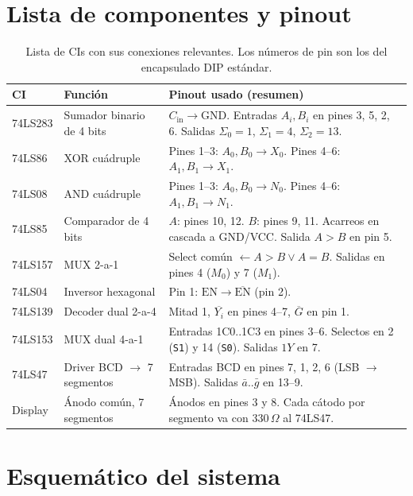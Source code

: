 \documentclass[a4paper,12pt]{article}
\begin{document}
\section{Lista de componentes y pinout}
\begin{table}[H]
\centering
\footnotesize
\setlength{\tabcolsep}{4pt}
\begin{tabular}{p{2.0cm}p{4.0cm}p{8.0cm}}
\toprule
\textbf{CI} & \textbf{Funci\'{o}n} & \textbf{Pinout usado (resumen)} \\
\midrule
74LS283 & Sumador binario de 4 bits
  & $C_\text{in}\!\to\!\mathrm{GND}$. Entradas $A_i,B_i$ en pines
    3, 5, 2, 6. Salidas $\Sigma_0{=}1$, $\Sigma_1{=}4$, $\Sigma_2{=}13$.\\
74LS86  & XOR cu\'{a}druple
  & Pines 1--3: $A_0,B_0\!\to\!X_0$. Pines 4--6: $A_1,B_1\!\to\!X_1$. \\
74LS08  & AND cu\'{a}druple
  & Pines 1--3: $A_0,B_0\!\to\!N_0$. Pines 4--6: $A_1,B_1\!\to\!N_1$. \\
74LS85  & Comparador de 4 bits
  & $A$: pines 10, 12. $B$: pines 9, 11. Acarreos en cascada a
    GND/VCC. Salida $A > B$ en pin 5. \\
74LS157 & MUX 2-a-1
  & Select com\'{u}n $\leftarrow A > B \lor A = B$. Salidas en
    pines 4 ($M_0$) y 7 ($M_1$). \\
74LS04  & Inversor hexagonal
  & Pin 1: $\mathrm{EN}\!\to\!\overline{\mathrm{EN}}$ (pin 2). \\
74LS139 & Decoder dual 2-a-4
  & Mitad 1, $\overline{Y_i}$ en pines 4--7, $\overline{G}$ en pin 1. \\
74LS153 & MUX dual 4-a-1
  & Entradas 1C0..1C3 en pines 3--6. Selectos en 2 (\texttt{S1}) y
    14 (\texttt{S0}). Salidas $1Y$ en 7. \\
74LS47  & Driver BCD $\to$ 7 segmentos
  & Entradas BCD en pines 7, 1, 2, 6 (LSB $\to$ MSB). Salidas
    $\bar a$..$\bar g$ en 13--9. \\
Display & \'{A}nodo com\'{u}n, 7 segmentos
  & \'{A}nodos en pines 3 y 8. Cada c\'{a}todo por segmento va con
    $330\,\Omega$ al 74LS47. \\
\bottomrule
\end{tabular}
\caption{Lista de CIs con sus conexiones relevantes. Los n\'{u}meros
de pin son los del encapsulado DIP est\'{a}ndar.}
\end{table}

\section{Esquem\'{a}tico del sistema}
\end{document}
